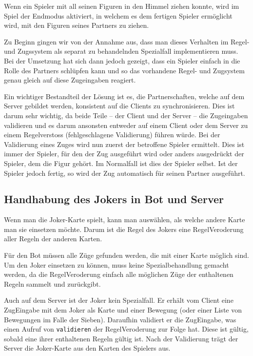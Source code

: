 \documentclass[12pt,halfparskip]{scrartcl}
\begin{document}
Wenn ein Spieler mit all seinen Figuren in den Himmel ziehen konnte, wird im Spiel der Endmodus aktiviert, in welchem es dem fertigen Spieler ermöglicht wird, mit den Figuren seines Partners zu ziehen.

Zu Beginn gingen wir von der Annahme aus, dass man dieses Verhalten im Regel- und Zugssystem als separat zu behandelnden Spezialfall implementieren muss. Bei der Umsetzung hat sich dann jedoch gezeigt, dass ein Spieler einfach in die Rolle des Partners schlüpfen kann und so das vorhandene Regel- und Zugsystem genau gleich auf diese Zugeingaben reagiert.

Ein wichtiger Bestandteil der Lösung ist es, die Partnerschaften, welche auf dem Server gebildet werden, konsistent auf die Clients zu synchronisieren. Dies ist darum sehr wichtig, da beide Teile -- der Client und der Server -- die Zugeingaben validieren und es darum ansonsten entweder auf einem Client oder dem Server zu einem Regelverstoss (fehlgeschlagene Validierung) führen würde. Bei der Validierung eines Zuges wird nun zuerst der betroffene Spieler ermittelt. Dies ist immer der Spieler, für den der Zug ausgeführt wird oder anders ausgedrückt der Spieler, dem die Figur gehört. Im Normalfall ist dies der Spieler selbst. Ist der Spieler jedoch fertig, so wird der Zug automatisch für seinen Partner ausgeführt.

\subsection{Handhabung des Jokers in Bot und Server}

Wenn man die Joker-Karte spielt, kann man auswählen, als welche andere Karte man sie einsetzen möchte. Darum ist die Regel des Jokers eine RegelVeroderung aller Regeln der anderen Karten.

Für den Bot müssen alle Züge gefunden werden, die mit einer Karte möglich sind. Um den Joker einsetzen zu können, muss keine Spezialbehandlung gemacht werden, da die RegelVeroderung einfach alle möglichen Züge der enthaltenen Regeln sammelt und zurückgibt.

Auch auf dem Server ist der Joker kein Spezialfall. Er erhält vom Client eine ZugEingabe mit dem Joker als Karte und einer Bewegung (oder einer Liste von Bewegungen im Falle der Sieben). Daraufhin validiert er die ZugEingabe, was einen Aufruf von \texttt{validieren} der RegelVeroderung zur Folge hat. Diese ist gültig, sobald eine ihrer enthaltenen Regeln gültig ist. Nach der Validierung trägt der Server die Joker-Karte aus den Karten des Spielers aus.
\end{document}
